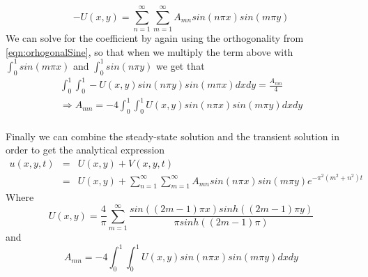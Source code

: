 \documentclass{article}
\begin{document}
\begin{equation}
-U(x,y) =  \sum_{n=1}^{\infty} \sum_{m=1}^{\infty} A_{mn}sin(n\pi x)sin(m\pi y)
\end{equation}
We can solve for the coefficient by again using the orthogonality from \ref{eqn:orhogonalSine}, so that when we multiply the term above with $\int_0^1 sin(m\pi x)$ and $\int_0^1 sin(n\pi y)$ we get that
\begin{subequations}
\begin{eqnarray}
\int_0^1 \int_0^1 -U(x,y) sin(n\pi y)sin(m\pi x) dxdy =  \frac{A_{mn}}{4}\\
\Rightarrow A_{mn} = -4 \int_0^1 \int_0^1 U(x,y) sin(n\pi x)sin(m\pi y) dxdy
\end{eqnarray}
\end{subequations}
\\
Finally we can combine the steady-state solution and the transient solution in order to get the analytical expression
\begin{eqnarray}
u(x,y,t) &=& U(x,y) + V(x,y,t)\\ \nonumber
 &=& U(x,y) + \sum_{n=1}^{\infty} \sum_{m=1}^{\infty} A_{mn}sin(n\pi x)sin(m\pi y)e^{-\pi^2(m^2+n^2)t}
\end{eqnarray}
Where
\begin{equation}
U(x,y) = \frac{4}{\pi} \sum_{m=1}^{\infty} \frac{sin((2m-1)\pi x)sinh((2m-1)\pi y)}{\pi sinh((2m-1)\pi)}
\end{equation}
and 
\begin{equation}
A_{mn} = -4 \int_0^1 \int_0^1 U(x,y) sin(n\pi x)sin(m\pi y) dxdy
\end{equation}
\end{document}
